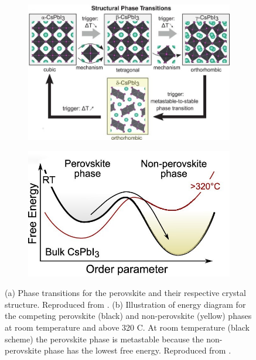 \begin{figure}[htbp]
    \centering
    \begin{subfigure}[t]{0.56\textwidth} %
        \centering
        \includegraphics[width=\textwidth]{chapters/introduction/image/perovskite_phases.jpeg} %
        \caption{}
        \label{fig:ch2:perovskite_phases}
    \end{subfigure}
    \hfill %
    \begin{subfigure}[t]{0.39\textwidth} %
        \centering
        \includegraphics[width=\textwidth]{chapters/introduction/image/perovskite_free_energy.jpeg} %
        \caption{}
        \label{fig:ch2:perovskite_free_energy}
    \end{subfigure}

    \caption[Phase transitions and phase stability for the  composition.]{(a) Phase transitions for the  perovskite and their respective crystal structure. Reproduced from \cite{Steele2019ThermalFilms}. (b) Illustration of energy diagram for the competing perovskite (black) and non-perovskite (yellow) phases at room temperature and above 320 \degree C. At room temperature (black scheme) the perovskite phase is metastable because the non-perovskite phase has the lowest free energy. Reproduced from \cite{Steele2021TrojansPerovskite}.}
    \label{fig:ch2:phases_and_free_energy}
\end{figure}

